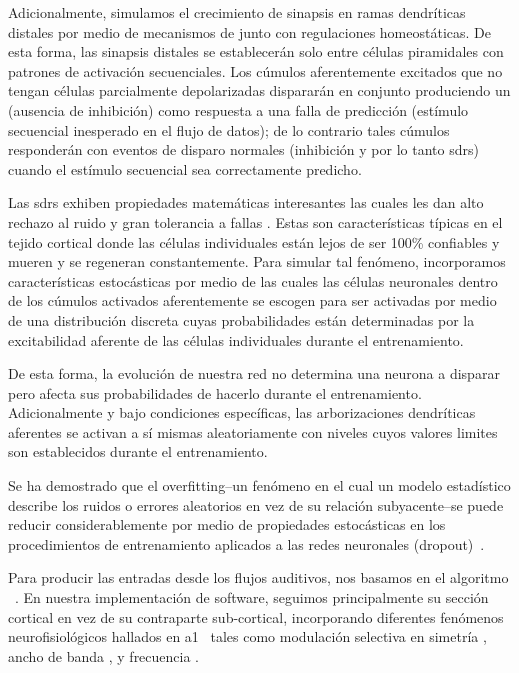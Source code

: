 {Adicionalmente, simulamos el crecimiento de sinapsis en ramas dendríticas distales por medio de mecanismos de  junto con
regulaciones homeostáticas. De esta forma, las sinapsis distales se establecerán solo entre células piramidales con patrones de activación secuenciales.
Los cúmulos aferentemente excitados que no tengan células parcialmente depolarizadas dispararán en conjunto produciendo un 
(ausencia de inhibición) como respuesta a una falla de predicción (estímulo secuencial inesperado en el flujo de datos); de lo contrario tales cúmulos responderán con eventos de disparo normales (inhibición y por lo tanto \glspl{sdr}) cuando el estímulo secuencial sea correctamente predicho.

Las \glspl{sdr} exhiben propiedades matemáticas interesantes las cuales les dan alto rechazo al ruido y gran tolerancia a fallas \cite{ahmad_2015}.
Estas son características típicas en el tejido cortical donde las células individuales están lejos de ser 100\% confiables y mueren y se regeneran constantemente. Para simular tal fenómeno, incorporamos características estocásticas por medio de las cuales las células neuronales dentro de los cúmulos activados aferentemente se escogen para ser activadas por medio de una distribución discreta cuyas probabilidades están determinadas por la excitabilidad aferente de las células individuales durante el entrenamiento.

De esta forma, la evolución de nuestra red no determina una neurona a disparar pero afecta sus probabilidades de hacerlo durante el entrenamiento. Adicionalmente y bajo condiciones específicas, las arborizaciones dendríticas aferentes se activan a sí mismas aleatoriamente con niveles cuyos valores limites son establecidos durante el entrenamiento.

Se ha demostrado que el overfitting--un fenómeno en el cual un modelo estadístico describe los ruidos o errores aleatorios en vez de su relación subyacente--se puede reducir considerablemente por medio de propiedades estocásticas en los procedimientos de entrenamiento aplicados a las redes neuronales (dropout)~\cite{JMLR:v15:srivastava14a}.

Para producir las entradas desde los flujos auditivos, nos basamos en el algoritmo ~\cite{chi_2005}. En nuestra implementación de software, seguimos principalmente su sección cortical en vez de su contraparte sub-cortical, incorporando diferentes fenómenos neurofisiológicos hallados en \gls{a1}~\cite{wang_1995} tales como modulación selectiva en simetría \cite{shamma_1993}, ancho de banda \cite{schreiner_1990}, y frecuencia \cite{shamma_1993,heil_1992,mendelson_1985}.



}
